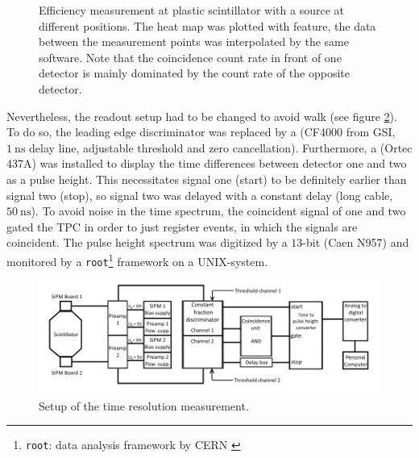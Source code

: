 \begin{figure}[h!]
	\hfill
	\hfill
	\caption[Efficiency measurement setup]{Efficiency measurement at plastic scintillator with a \sr{} source at different positions. The heat map was plotted with  feature, the data between the measurement points was interpolated by the same software. Note that the coincidence count rate in front of one detector is mainly dominated by the count rate of the opposite detector.}
	\label{fig:ch5:efficiency}
\end{figure} 
\newpage
Nevertheless, the readout setup had to be changed to avoid walk (see figure \ref{fig:ch5:scheme_timing}). To do so, the leading edge discriminator was replaced by a  (CF4000 from GSI, $\SI{1}{\nano\second}$ delay line, adjustable threshold and zero cancellation). Furthermore, a  (Ortec 437A) was installed to display the time differences between detector one and two as a pulse height. This necessitates signal one (start) to be definitely earlier than signal two (stop), so signal two was delayed with a constant delay (long cable, $\SI{50}{\nano\second}$). To avoid noise in the time spectrum, the coincident signal of one and two gated the TPC in order to just register events, in which the signals are coincident. The pulse height spectrum was digitized by a $13$-bit  (Caen N957) and monitored by a \texttt{root}\footnote{\texttt{root}: data analysis framework by CERN \cite{root}} framework on a UNIX-system. \par
\begin{figure}[t!]
	\centering
	\includegraphics[width=1\linewidth]{./graphics/ch5/scheme_timing.png}
	\caption[Schematic of the time resolution measurement]{Setup of the time resolution measurement.}
	\label{fig:ch5:scheme_timing}
\end{figure} 
